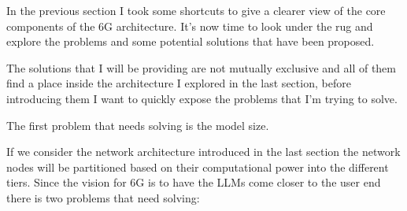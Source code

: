 

In the previous section I took some shortcuts to give a clearer view of the core components of the
6G architecture. It's now time to look under the rug and explore the problems and some potential solutions that have been proposed.

The solutions that I will be providing are not mutually exclusive and all of them find a place
inside the architecture I explored in the last section, before introducing them I want to quickly
expose the problems that I'm trying to solve.

The first problem that needs solving is the model size.

If we consider the network architecture introduced in the last section the network nodes will be
partitioned based on their computational power into the different tiers. Since the vision for 6G is
to have the LLMs come closer to the user end there is two problems that need solving:
